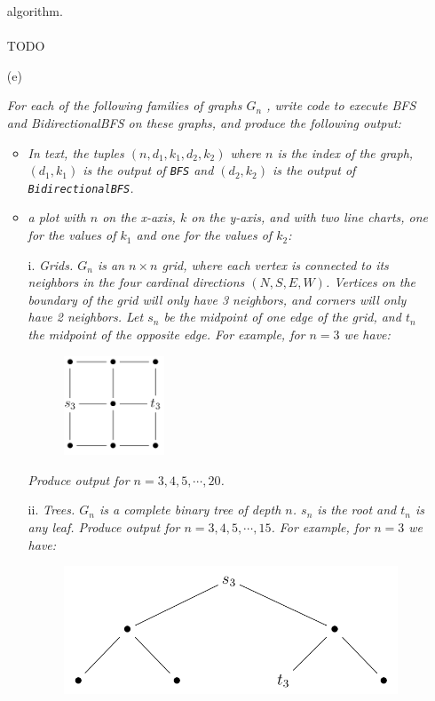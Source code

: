 \documentclass[12pt]{article} \setlength{\oddsidemargin}{0in}
\begin{document}
\begin{enumerate}
{{algorithm.}}
  \\\\
  TODO
  \\
\item[(e)]{\textit{For each of the following families of graphs $G_n$ , write code to execute BFS and BidirectionalBFS on these graphs, and produce the following output:}
    \begin{itemize}
    \item \textit{In text, the tuples $(n, d_1, k_1, d_2, k_2)$ where $n$ is the index of the graph, $(d_1, k_1)$ is the output of \texttt{BFS} and $(d_2, k_2)$ is the output of \texttt{BidirectionalBFS}.}
    \item \textit{a plot with $n$ on the x-axis, $k$ on the y-axis, and with two line charts, one for the values of $k_1$ and one for the values of $k_2$:}
    \end{itemize}
    \begin{enumerate}
    \item[i.] \textit{Grids. $G_n$ is an $n \times n$ grid, where each vertex is connected to its neighbors in the four cardinal directions $(N,S,E,W)$. Vertices on the boundary of the grid
will only have 3 neighbors, and corners will only have 2 neighbors. Let $s_n$
be the midpoint of one edge of the grid, and $t_n$ the midpoint of the opposite
edge. For example, for $n = 3$ we have:}

\begin{figure}[h]
  \centering \includegraphics[width=0.3\textwidth]{P41}
\end{figure}

\textit{Produce output for $n = 3, 4, 5, \cdots, 20$.}

\item[ii.] \textit{Trees. $G_n$ is a complete binary tree of depth $n$. $s_n$ is the root and $t_n$ is any leaf. Produce output for $n = 3, 4, 5, \cdots, 15$. For example, for $n = 3$ we have:}

  \begin{figure}[H]
  \centering \includegraphics[width=1\textwidth]{P42}
  \end{figure}


\end{enumerate}}
\end{enumerate}
\end{document}
